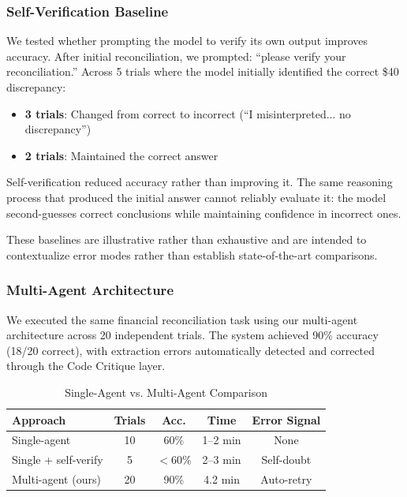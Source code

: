 \documentclass[sigconf]{acmart}
\begin{document}
\subsubsection{Self-Verification Baseline}

We tested whether prompting the model to verify its own output improves accuracy. After initial reconciliation, we prompted: ``please verify your reconciliation.'' Across 5 trials where the model initially identified the correct \$40 discrepancy:

\begin{itemize}
  \item \textbf{3 trials}: Changed from correct to incorrect (``I misinterpreted... no discrepancy'')
  \item \textbf{2 trials}: Maintained the correct answer
\end{itemize}

Self-verification reduced accuracy rather than improving it. The same reasoning process that produced the initial answer cannot reliably evaluate it: the model second-guesses correct conclusions while maintaining confidence in incorrect ones.

These baselines are illustrative rather than exhaustive and are intended to contextualize error modes rather than establish state-of-the-art comparisons.

\subsubsection{Multi-Agent Architecture}

We executed the same financial reconciliation task using our multi-agent architecture across 20 independent trials. The system achieved 90\% accuracy (18/20 correct), with extraction errors automatically detected and corrected through the Code Critique layer.

\begin{table}[H]
\centering
\caption{Single-Agent vs. Multi-Agent Comparison}
\label{tab:comparative}
\footnotesize
\begin{tabular}{@{}lcccc@{}}
\toprule
\textbf{Approach} & \textbf{Trials} & \textbf{Acc.} & \textbf{Time} & \textbf{Error Signal} \\
\midrule
Single-agent & 10 & 60\% & 1--2 min & None \\
Single + self-verify & 5 & $<$60\% & 2--3 min & Self-doubt \\
Multi-agent (ours) & 20 & 90\% & 4.2 min & Auto-retry \\
\bottomrule
\end{tabular}
\end{table}
\end{document}
